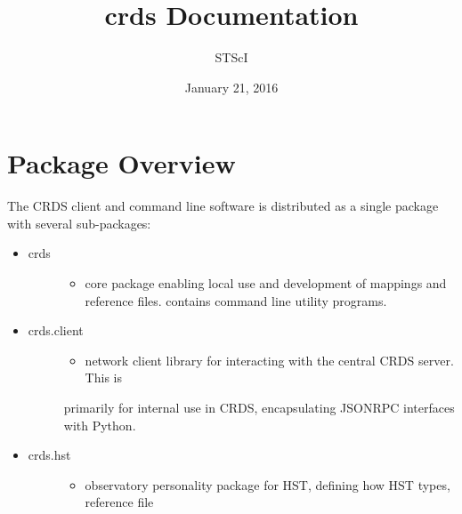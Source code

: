 \documentclass[letterpaper,10pt,english]{sphinxmanual}
\title{crds Documentation}
\date{January 21, 2016}
\author{STScI}
\begin{document}
\maketitle
\tableofcontents
{}\label{index::doc}



\chapter{Package Overview}
\label{installation:package-overview}\label{installation:crds-user-manual}\label{installation::doc}
The CRDS client and command line software is distributed as a single package with
several sub-packages:
\begin{itemize}
\item {} \begin{description}
\item[{crds}] \leavevmode\begin{itemize}
\item {} 
core package enabling local use and development of mappings
and reference files.  contains command line utility programs.

\end{itemize}

\end{description}

\item {} \begin{description}
\item[{crds.client}] \leavevmode\begin{itemize}
\item {} 
network client library for interacting with the central CRDS server.  This is

\end{itemize}

primarily for internal use in CRDS,  encapsulating JSONRPC interfaces with Python.

\end{description}

\item {} \begin{description}
\item[{crds.hst}] \leavevmode\begin{itemize}
\item {} 
observatory personality package for HST, defining how HST types, reference file

\end{itemize}


\end{description}
\end{itemize}
\end{document}
